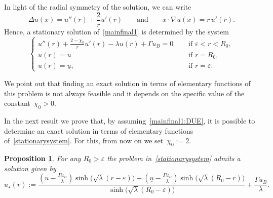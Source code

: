 \documentclass[12pt,a4paper,intlimits,sumlimits]{amsart}
\theoremstyle{definition}
\theoremstyle{plain}
\newtheorem{proposition}[definition]{Proposition}
\numberwithin{equation}{section}
\renewcommand{\le}{\leqslant}
\begin{document}
In light of the radial symmetry of the solution, we can write
\begin{equation}\label{laplradial}
\Delta u(x) = u''(r)+\frac{2}{r}u'(r)\qquad {\mbox{and}}\qquad
x\cdot\nabla u(x) = r\, u'(r).
\end{equation}
Hence, a stationary solution of~\eqref{mainfinal1} is determined by the system
\begin{equation}\label{stationarysystem}
\begin{cases}
u''(r)+\displaystyle\frac{2-\chi_0}{r}u'(r) -\lambda u(r)+\Gamma u_B=0 &\quad\mbox{ if } \varepsilon<r<R_0,\\
u(r) = \overline{u} &\quad\mbox{ if } r=R_0, \\
u(r) = \underline{u}, &\quad\mbox{ if } r=\varepsilon.
\end{cases}
\end{equation}

We point out that
finding an exact solution in terms of elementary functions of this problem
is not always feasible and it depends on the specific value of the constant~$\chi_0>0$.

In the next result we prove that, by assuming~\eqref{mainfinal1:DUE}, it is possible to determine an exact solution in terms of elementary functions of~\eqref{stationarysystem}. For this, from now on we set~$\chi_0:=2$.

\begin{proposition}\label{propsoluzionestazionaria}
For any $R_0>\varepsilon$ the problem in~\eqref{stationarysystem} admits a solution given by
\begin{equation}\label{stationaryall}
u_\star(r):=
\frac{\left(\overline{u}-\frac{\Gamma u_B}{\lambda}\right)
\sinh\big(\sqrt{\lambda}(r-\varepsilon)\big) +\left(\underline{u}-\frac{\Gamma u_B}{\lambda}\right)
\sinh\big(\sqrt{\lambda}(R_0-r)\big)}{\sinh\big(\sqrt{\lambda}(R_0-\varepsilon)\big)}
+\frac{\Gamma u_B}{\lambda}.
\end{equation} 
\end{proposition}
\end{document}

